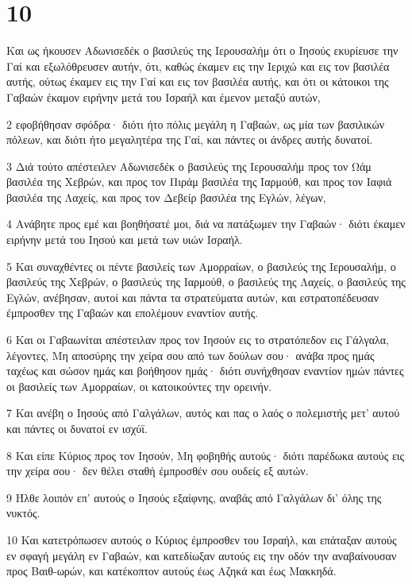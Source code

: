 \chapter{10}

\par Και ως ήκουσεν Αδωνισεδέκ ο βασιλεύς της Ιερουσαλήμ ότι ο Ιησούς εκυρίευσε την Γαί και εξωλόθρευσεν αυτήν, ότι, καθώς έκαμεν εις την Ιεριχώ και εις τον βασιλέα αυτής, ούτως έκαμεν εις την Γαί και εις τον βασιλέα αυτής, και ότι οι κάτοικοι της Γαβαών έκαμον ειρήνην μετά του Ισραήλ και έμενον μεταξύ αυτών,
\par 2 εφοβήθησαν σφόδρα· διότι ήτο πόλις μεγάλη η Γαβαών, ως μία των βασιλικών πόλεων, και διότι ήτο μεγαλητέρα της Γαί, και πάντες οι άνδρες αυτής δυνατοί.
\par 3 Διά τούτο απέστειλεν Αδωνισεδέκ ο βασιλεύς της Ιερουσαλήμ προς τον Ωάμ βασιλέα της Χεβρών, και προς τον Πιράμ βασιλέα της Ιαρμούθ, και προς τον Ιαφιά βασιλέα της Λαχείς, και προς τον Δεβείρ βασιλέα της Εγλών, λέγων,
\par 4 Ανάβητε προς εμέ και βοηθήσατέ μοι, διά να πατάξωμεν την Γαβαών· διότι έκαμεν ειρήνην μετά του Ιησού και μετά των υιών Ισραήλ.
\par 5 Και συναχθέντες οι πέντε βασιλείς των Αμορραίων, ο βασιλεύς της Ιερουσαλήμ, ο βασιλεύς της Χεβρών, ο βασιλεύς της Ιαρμούθ, ο βασιλεύς της Λαχείς, ο βασιλεύς της Εγλών, ανέβησαν, αυτοί και πάντα τα στρατεύματα αυτών, και εστρατοπέδευσαν έμπροσθεν της Γαβαών και επολέμουν εναντίον αυτής.
\par 6 Και οι Γαβαωνίται απέστειλαν προς τον Ιησούν εις το στρατόπεδον εις Γάλγαλα, λέγοντες, Μη αποσύρης την χείρα σου από των δούλων σου· ανάβα προς ημάς ταχέως και σώσον ημάς και βοήθησον ημάς· διότι συνήχθησαν εναντίον ημών πάντες οι βασιλείς των Αμορραίων, οι κατοικούντες την ορεινήν.
\par 7 Και ανέβη ο Ιησούς από Γαλγάλων, αυτός και πας ο λαός ο πολεμιστής μετ' αυτού και πάντες οι δυνατοί εν ισχύϊ.
\par 8 Και είπε Κύριος προς τον Ιησούν, Μη φοβηθής αυτούς· διότι παρέδωκα αυτούς εις την χείρα σου· δεν θέλει σταθή έμπροσθέν σου ουδείς εξ αυτών.
\par 9 Ήλθε λοιπόν επ' αυτούς ο Ιησούς εξαίφνης, αναβάς από Γαλγάλων δι' όλης της νυκτός.
\par 10 Και κατετρόπωσεν αυτούς ο Κύριος έμπροσθεν του Ισραήλ, και επάταξαν αυτούς εν σφαγή μεγάλη εν Γαβαών, και κατεδίωξαν αυτούς εις την οδόν την αναβαίνουσαν προς Βαιθ-ωρών, και κατέκοπτον αυτούς έως Αζηκά και έως Μακκηδά.

